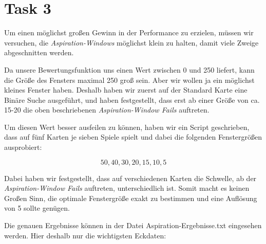 \section{Task 3}
Um einen möglichst großen Gewinn in der Performance zu erzielen, müssen wir versuchen, die \textit{Aspiration-Windows} möglichst klein zu halten, damit viele Zweige abgeschnitten werden.

Da unsere Bewertungsfunktion uns einen Wert zwischen 0 und 250 liefert, kann die Größe des Fensters maximal 250 groß sein. Aber wir wollen ja ein möglichst kleines Fenster haben. Deshalb haben wir zuerst auf der Standard Karte eine Binäre Suche ausgeführt, und haben festgestellt, dass erst ab einer Größe von ca. 15-20 die oben beschriebenen \textit{Aspiration-Window Fails} auftreten.

Um diesen Wert besser ausfeilen zu können, haben wir ein Script geschrieben, dass auf fünf Karten je sieben Spiele spielt und dabei die folgenden Fenstergrößen ausprobiert:

$$ 50, 40, 30, 20, 15, 10, 5$$

Dabei haben wir festgestellt, dass auf verschiedenen Karten die Schwelle, ab der \textit{Aspiration-Window Fails} auftreten, unterschiedlich ist. Somit macht es keinen Großen Sinn, die optimale Fenstergröße exakt zu bestimmen und eine Auflösung von 5 sollte genügen.

Die genauen Ergebnisse können in der Datei Aspiration-Ergebnisse.txt eingesehen werden.
Hier deshalb nur die wichtigsten Eckdaten:

